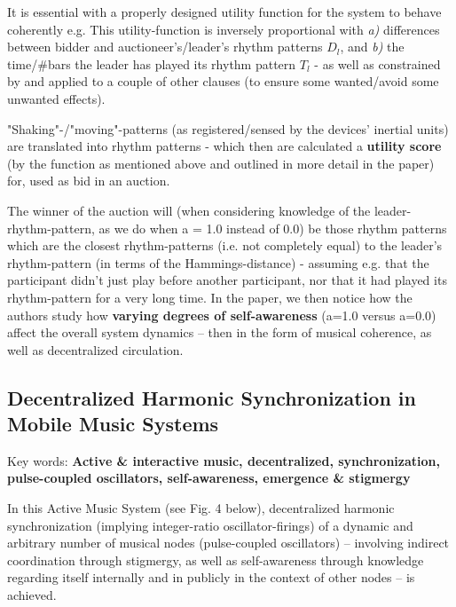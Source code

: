 \documentclass{article}
\begin{document}
It is essential with a properly designed utility function for the system to behave coherently e.g. This utility-function is inversely proportional with \textit{a)} differences between bidder and auctioneer's/leader's rhythm patterns $D_l$, and \textit{b)} the time/\#bars the leader has played its rhythm pattern $T_l$ - as well as constrained by and applied to a couple of other clauses (to ensure some wanted/avoid some unwanted effects).

"Shaking"-/"moving"-patterns (as registered/sensed by the devices' inertial units) are translated into rhythm patterns - which then are calculated a \textbf{utility score} (by the function as mentioned above and outlined in more detail in the paper) for, used as bid in an auction.

The winner of the auction will (when considering knowledge of the leader-rhythm-pattern, as we do when a = 1.0 instead of 0.0) be those rhythm patterns which are the closest rhythm-patterns (i.e. not completely equal) to the leader's rhythm-pattern (in terms of the Hammings-distance) - assuming e.g. that the participant didn't just play before another participant, nor that it had played its rhythm-pattern for a very long time. In the paper, we then notice how the authors study how \textbf{varying degrees of self-awareness} (a=1.0 versus a=0.0) affect the overall system dynamics -- then in the form of musical coherence, as well as decentralized circulation.

\subsection{Decentralized Harmonic Synchronization in Mobile Music Systems}

Key words: \textbf{Active \& interactive music, decentralized, synchronization, pulse-coupled oscillators, self-awareness, emergence \& stigmergy}
\newline

In this Active Music System \cite{nymoen_synch} (see Fig. 4 below), decentralized harmonic synchronization (implying integer-ratio oscillator-firings) of a dynamic and arbitrary number of musical nodes (pulse-coupled oscillators) -- involving indirect coordination through stigmergy, as well as self-awareness through knowledge regarding itself internally and in publicly in the context of other nodes -- is achieved.
\newline
\end{document}
